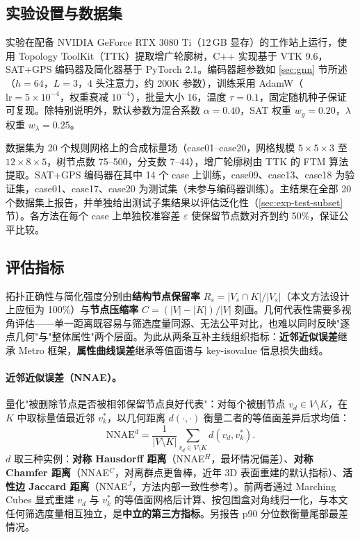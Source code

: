 \documentclass[twocolumn, a4paper, 10pt]{article}
\begin{document}
\subsection{实验设置与数据集}
\label{sec:exp-setup}

实验在配备 NVIDIA GeForce RTX 3080 Ti（12\,GB 显存）的工作站上运行，使用 Topology ToolKit（TTK）提取增广轮廓树，C++ 实现基于 VTK 9.6，SAT+GPS 编码器及简化器基于 PyTorch 2.1。编码器超参数如 \ref{sec:gnn} 节所述（$h{=}64$，$L{=}3$，4 头注意力，约 200K 参数），训练采用 AdamW（$\mathrm{lr}{=}5{\times}10^{-4}$，权重衰减 $10^{-4}$），批量大小 16，温度 $\tau{=}0.1$，固定随机种子保证可复现。除特别说明外，默认参数为混合系数 $\alpha = 0.40$，SAT 权重 $w_g = 0.20$，$\lambda$ 权重 $w_\lambda = 0.25$。

数据集为 20 个规则网格上的合成标量场（case01--case20，网格规模 $5\times5\times3$ 至 $12\times8\times5$，树节点数 75--500，分支数 7--44），增广轮廓树由 TTK 的 FTM 算法提取。SAT+GPS 编码器在其中 14 个 case 上训练，case09、case13、case18 为验证集，case01、case17、case20 为测试集（未参与编码器训练）。主结果在全部 20 个数据集上报告，并单独给出测试子集结果以评估泛化性（\ref{sec:exp-test-subset} 节）。各方法在每个 case 上单独校准容差 $\varepsilon$ 使保留节点数对齐到约 50\%，保证公平比较。
\label{sec:exp-dataset}

\subsection{评估指标}
\label{sec:exp-metrics}

拓扑正确性与简化强度分别由\textbf{结构节点保留率} $R_s = |V_s \cap K| / |V_s|$（本文方法设计上应恒为 100\%）与\textbf{节点压缩率} $C = (|V| - |K|)/|V|$ 刻画。几何代表性需要多视角评估——单一距离既容易与筛选度量同源、无法公平对比，也难以同时反映"逐点几何"与"整体属性"两个层面。为此从两条互补主线组织指标：\textbf{近邻近似误差}继承 Metro 框架\cite{cignoni_metro_1998,livesu_mesh_quality_2023}，\textbf{属性曲线误差}继承等值面谱与 key-isovalue 信息损失曲线\cite{bajaj_spectrum_1997,zhou_keyisovalue_2025}。

\paragraph{近邻近似误差（NNAE）。}量化"被删除节点是否被相邻保留节点良好代表"：对每个被删节点 $v_d \in V \setminus K$，在 $K$ 中取标量值最近邻 $v_k^*$，以几何距离 $d(\cdot,\cdot)$ 衡量二者的等值面差异后求均值：
\begin{equation}
\text{NNAE}^{d} = \frac{1}{|V \setminus K|}\sum_{v_d \in V\setminus K} d(v_d, v_k^*).
\end{equation}
$d$ 取三种实例：\textbf{对称 Hausdorff 距离}（NNAE$^H$，最坏情况偏差）、\textbf{对称 Chamfer 距离}（NNAE$^C$，对离群点更鲁棒，近年 3D 表面重建的默认指标）、\textbf{活性边 Jaccard 距离}（NNAE$^J$，方法内部一致性参考）。前两者通过 Marching Cubes\cite{lorensen_cline_1987} 显式重建 $v_d$ 与 $v_k^*$ 的等值面网格后计算、按包围盒对角线归一化，与本文任何筛选度量相互独立，是\textbf{中立的第三方指标}。另报告 p90 分位数衡量尾部最差情况。
\end{document}
